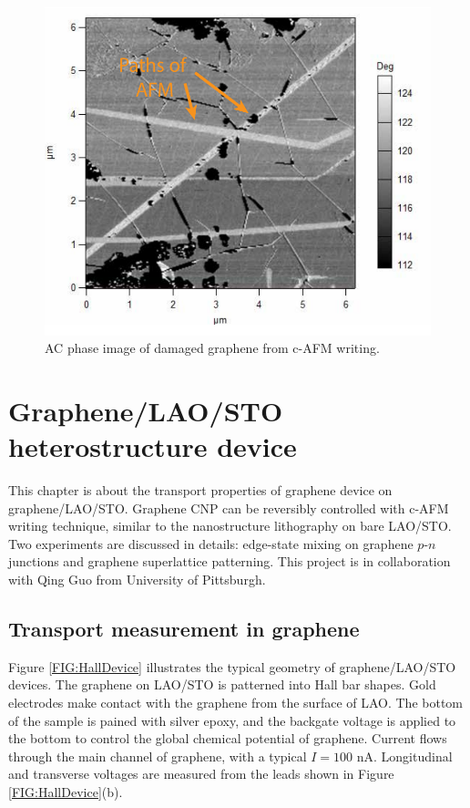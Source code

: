 \documentclass[pdflatex, sectionletters, 12pt]{pittetd}    %
\begin{document}
\begin{figure}[h!]
	\centering
	\includegraphics[width=.7\textwidth]{Drawing/GrapheneDamages.pdf}
	\caption{AC phase image of damaged graphene from c-AFM writing.}
	\label{FIG:GrapheneDamages}
\end{figure}

\chapter{Graphene/LAO/STO heterostructure device}
\label{SEC:GCO}

This chapter is about the transport properties of graphene device on graphene/LAO/STO. Graphene CNP can be reversibly controlled with c-AFM writing technique, similar to the nanostructure lithography on bare LAO/STO. Two experiments are discussed in details: edge-state mixing on graphene $p$-$n$ junctions and graphene superlattice patterning. This project is in collaboration with Qing Guo from University of Pittsburgh.

\section{Transport measurement in graphene}

Figure \ref{FIG:HallDevice} illustrates the typical geometry of graphene/LAO/STO devices. The graphene on LAO/STO is patterned into Hall bar shapes. Gold electrodes make contact with the graphene from the surface of LAO. The bottom of the sample is pained with silver epoxy, and the backgate voltage is applied to the bottom to control the global chemical potential of graphene. Current flows through the main channel of graphene, with a typical $I = 100$ nA. Longitudinal and transverse voltages are measured from the leads shown in Figure \ref{FIG:HallDevice}(b).
\end{document}
